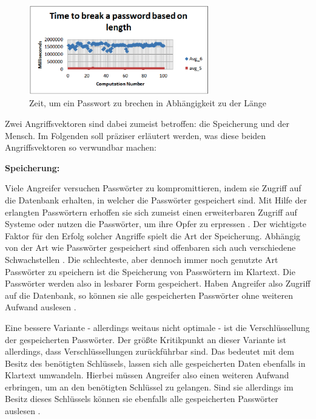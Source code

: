     \begin{figure}[H]
        \centering 
        \includegraphics[width=0.7\textwidth]{img/abbildungen/length-time.png}
        \captionsetup{format=hang}
        \caption{Zeit, um ein Passwort zu brechen in Abhängigkeit zu der Länge} \label{timetobreak}
    \end{figure}

    Zwei Angriffsvektoren sind dabei zumeist betroffen: die Speicherung und der Mensch. Im Folgenden soll präziser erläutert werden, was diese beiden Angriffsvektoren so verwundbar machen:

    \textbf{Speicherung:}

    Viele Angreifer versuchen Passwörter zu kompromittieren, indem sie Zugriff auf die Datenbank erhalten, in welcher die Passwörter gespeichert sind. Mit Hilfe der erlangten Passwörtern erhoffen sie sich zumeist einen erweiterbaren Zugriff auf Systeme oder nutzen die Passwörter, um ihre Opfer zu erpressen \cite{boonkrong2012security}. Der wichtigste Faktor für den Erfolg solcher Angriffe spielt die Art der Speicherung. Abhängig von der Art wie Passwörter gespeichert sind offenbaren sich auch verschiedene Schwachstellen \cite{chanda2016password}.
    Die schlechteste, aber dennoch immer noch genutzte Art Passwörter zu speichern ist die Speicherung von Passwörtern im Klartext. Die Passwörter werden also in lesbarer Form gespeichert. Haben Angreifer also Zugriff auf die Datenbank, so können sie alle gespeicherten Passwörter ohne weiteren Aufwand auslesen \cite{chanda2016password}.

    Eine bessere Variante - allerdings weitaus nicht optimale - ist die Verschlüssellung der gespeicherten Passwörter. Der größte Kritikpunkt an dieser Variante ist allerdings, dass Verschlüssellungen zurückführbar sind. Das bedeutet mit dem Besitz des benötigten Schlüssels, lassen sich alle gespeicherten Daten ebenfalls in Klartext umwandeln. Hierbei müssen Angreifer also einen weiteren Aufwand erbringen, um an den benötigten Schlüssel zu gelangen. Sind sie allerdings im Besitz dieses Schlüssels können sie ebenfalls alle gespeicherten Passwörter auslesen \cite*{chanda2016password}. 

